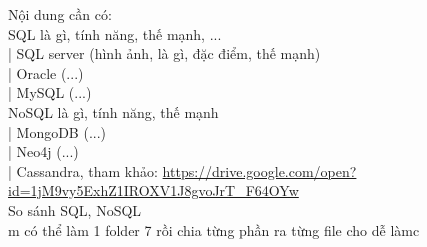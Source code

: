 	
Nội dung cần có:\\
SQL là gì, tính năng, thế mạnh, ...\\
|    SQL server (hình ảnh, là gì, đặc điểm, thế mạnh)\\
|    Oracle     (...)\\
|    MySQL      (...)\\
NoSQL là gì, tính năng, thế mạnh\\
|    MongoDB    (...)\\
|    Neo4j      (...)\\
|    Cassandra, tham khảo: \url{https://drive.google.com/open?id=1jM9vy5ExhZ1IROXV1J8gvoJrT_F64OYw}\\
So sánh SQL, NoSQL\\
m có thể làm 1 folder 7 rồi chia từng phần ra từng file cho dễ làmc